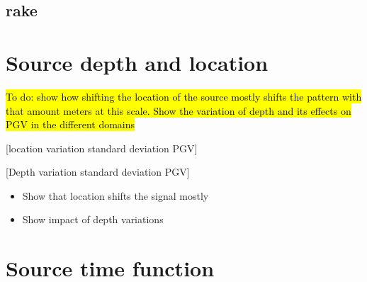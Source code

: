 \documentclass[../Text/00main.tex]{subfiles}
\begin{document}



\subsection{rake}















\section{Source depth and location}

\hl{To do: show how shifting the location of the source mostly shifts the pattern with that amount meters at this scale. Show the variation of depth and its effects on PGV in the different domains}

[location variation standard deviation PGV]

[Depth variation standard deviation PGV]

\begin{itemize}
    \item Show that location shifts the signal mostly
    \item Show impact of depth variations
\end{itemize}

\section{Source time function}
\end{document}
